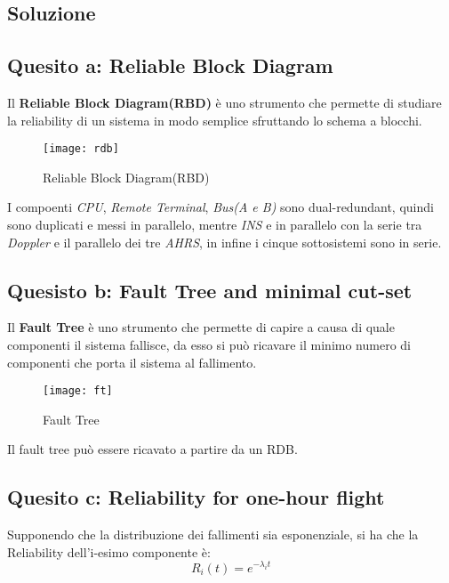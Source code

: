 \clearpage
\subsection{Soluzione}

\subsection{Quesito a: Reliable Block Diagram}

Il \textbf{Reliable Block Diagram(RBD)} è uno strumento che permette di studiare
la reliability di un sistema in modo semplice sfruttando lo schema a blocchi.\\

\begin{figure}[!htbp]
  \centering
  \texttt{[image: rdb]}
  \caption{Reliable Block Diagram(RBD)}
  \label{rdb}
\end{figure}

I compoenti \textit{CPU}, \textit{Remote Terminal}, \textit{Bus(A e B)} sono
dual-redundant, quindi sono duplicati e messi in parallelo, mentre \textit{INS} e
in parallelo con la serie tra \textit{Doppler} e il parallelo dei tre \textit{AHRS},
in infine i cinque sottosistemi sono in serie.

\subsection{Quesisto b: Fault Tree and minimal cut-set}

Il \textbf{Fault Tree} è uno strumento che permette di capire a causa di quale
componenti il sistema fallisce, da esso si può ricavare il minimo numero di
componenti che porta il sistema al fallimento.

\begin{figure}[!htbp]
  \centering
  \texttt{[image: ft]}
  \caption{Fault Tree}
  \label{ft}
\end{figure}

Il fault tree può essere ricavato a partire da un RDB.

\subsection{Quesito c: Reliability for one-hour flight}

Supponendo che la distribuzione dei fallimenti sia esponenziale, si ha che la
Reliability dell'i-esimo componente è:
$$R_i(t) = e^{-\lambda_i t}$$

